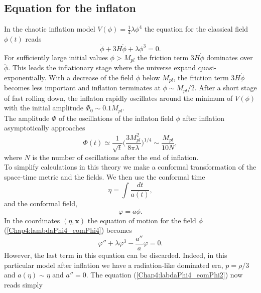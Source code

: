 \documentclass[11pt,a4paper,twoside]{book}
\begin{document}
\subsection{Equation for the inflaton}
In the chaotic inflation model $ V(\phi)=\frac{1}{4} \lambda \phi^{4}$ the equation for the classical field $\phi(t)$ reads
\begin{equation}
\label{Chap4:lambdaPhi4_eomPhi4}
\ddot{\phi} + 3H\dot{\phi} + \lambda \phi^{3}=0.
\end{equation}
 For sufficiently large initial values $\phi > M_{pl}$ the friction term $ 3H\dot{\phi} $ dominates over $\ddot{\phi}$. This leads the inflationary stage where the universe expand quasi-exponentially. With a decrease of the field $\phi$ below $ M_{pl} $, the friction term $ 3H\dot{\phi} $ becomes less important and inflation terminates at $ \phi \sim M_{pl}/2 $. After a short stage of fast rolling down, the inflaton rapidly oscillates around  the minimum of $ V(\phi) $ with the initial amplitude $ \Phi_{0} \sim 0.1 M_{pl} $.\\
 The amplitude $\Phi$ of the oscillations of the inflaton field $\phi$ after inflation asymptotically approaches
 \begin{equation}
\label{Chap4:lambdaPhi4_inflaton}
\Phi(t) \simeq \frac{1}{\sqrt{t}}\Bigg(\frac{3M_{pl}^{2}}{8\pi \lambda}\Bigg)^{1/4} \sim \frac{M_{pl}}{10N},
 \end{equation}
 where $ N $ is the number of oscillations after the end of inflation.\\
 To simplify calculations in this theory we make a conformal transformation of the space-time metric and the fields. We then use the conformal time
 \begin{equation}
\label{Chap4:ConformalTime}
\eta = \int \frac{dt}{a(t)},
 \end{equation}
 and the conformal field,
 \begin{equation}
 	\label{Chap4:lambdaPhi4_ConformalField}
\varphi = a\phi.
 \end{equation}
 In the coordinates $ (\eta,\textbf{x}) $ the equation of motion for the field $\phi$ (\ref{Chap4:lambdaPhi4_eomPhi4}) becomes 
 \begin{equation}
\label{Chap4:labdaPhi4_eomPhi2}
\varphi'' + \lambda\varphi^{3} - \frac{a''}{a}\varphi=0.
 \end{equation}
 However, the last term in this equation can be discarded. Indeed, in this particular model after inflation we have a radiation-like dominated era, $ p=\rho/3 $ and $ a(\eta) \sim \eta $ and $ a''= 0 $. The equation (\ref{Chap4:labdaPhi4_eomPhi2}) now reads simply
\end{document}
